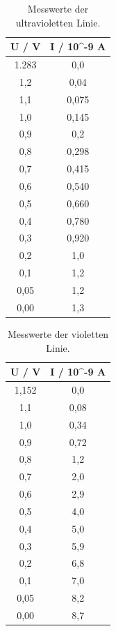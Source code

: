 \begin{table}
  \centering
  \caption{Messwerte der ultravioletten Linie.}
  \label{tab:spek1}
  \begin{tabular}{c c}
    \toprule
    U / V & I / 10\textasciicircum -9 A \\
    \midrule
    1.283 &         0,0 \\
      1,2 &        0,04 \\
      1,1 &       0,075 \\
      1,0 &       0,145 \\
      0,9 &         0,2 \\
      0,8 &       0,298 \\
      0,7 &       0,415 \\
      0,6 &       0,540 \\
      0,5 &       0,660 \\
      0,4 &       0,780 \\
      0,3 &       0,920 \\
      0,2 &         1,0 \\
      0,1 &         1,2 \\
     0,05 &         1,2 \\
     0,00 &         1,3 \\
    \bottomrule
  \end{tabular}
\end{table}

\begin{table} 
  \centering
  \caption{Messwerte der violetten Linie.}
  \label{tab:spek2}
  \begin{tabular}{c c}
    \toprule
    U / V & I / 10\textasciicircum -9 A \\
    \midrule
    1,152 &         0,0 \\
      1,1 &        0,08 \\
      1,0 &        0,34 \\
      0,9 &        0,72 \\
      0,8 &         1,2 \\
      0,7 &         2,0 \\
      0,6 &         2,9 \\
      0,5 &         4,0 \\
      0,4 &         5,0 \\
      0,3 &         5,9 \\
      0,2 &         6,8 \\
      0,1 &         7,0 \\
     0,05 &         8,2 \\
     0,00 &         8,7 \\
    \bottomrule
    \end{tabular}
\end{table}

